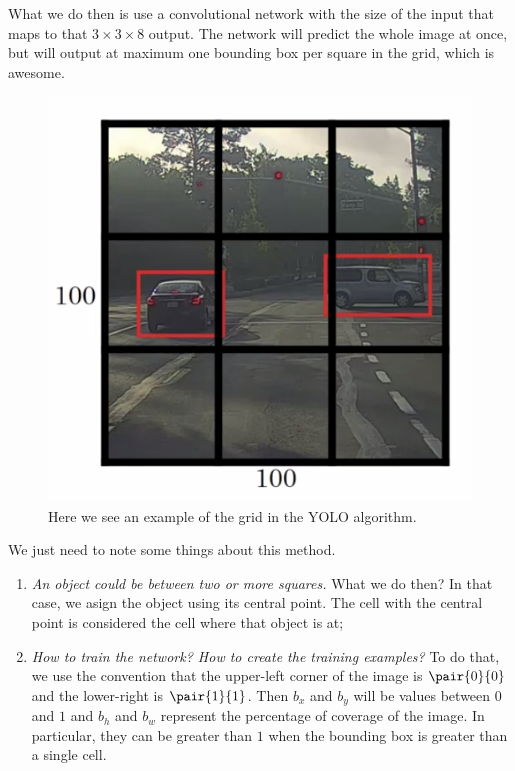 \documentclass[12pt, a4paper, oneside]{book}
\begin{document}
What we do then is use a convolutional network with the size of the input that
maps to that $3\times 3\times 8$ output. The network will predict the whole
image at once, but will output at maximum one bounding box per square in the
grid, which is awesome.

\begin{figure}[h]
\centering
\includegraphics[scale=0.5]{Res/yolo_example.png}
\caption{Here we see an example of the grid in the YOLO algorithm.}
\label{yolo_example.png}
\end{figure}

We just need to note some things about this method.
\begin{enumerate}
    \item \textit{An object could be between two or more squares.} What we do
        then? In that case, we asign the object using its central point. The
        cell with the central point is considered the cell where that object is
        at;
    \item \textit{How to train the network? How to create the training
            examples?} To do that, we use the convention that the upper-left
            corner of the image is $\pair{0}{0}$ and the lower-right is
            $\pair{1}{1}$. Then $b_x$ and $b_y$ will be values between $0$ and
            $1$ and $b_h$ and $b_w$ represent the percentage of coverage of the
            image. In particular, they can be greater than $1$ when the bounding
            box is greater than a single cell.
\end{enumerate}
\end{document}
